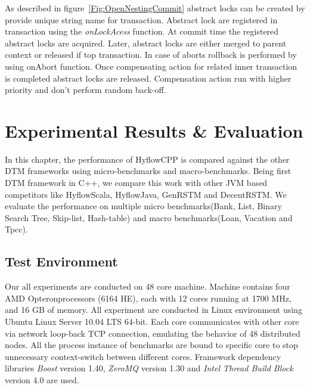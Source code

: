 \documentclass[12pt,english]{report}
\begin{document}
As described in figure~\ref{Fig:OpenNestingCommit} abstract locks can be created by provide unique string name for transaction. Abstract lock are registered in transaction using the \textit{onLockAcess} function. At commit time the registered abstract locks are acquired. Later, abstract locks are either merged to parent context or released if top transaction. In case of aborts rollback is performed by using onAbort function. Once compensating action for related inner transaction is completed abstract locks are released. Compensation action run with higher priority and don't perform random back-off.   


\chapter{Experimental Results \& Evaluation}\label{chap:expResults}

In this chapter, the performance of HyflowCPP is compared against the other DTM frameworks using micro-benchmarks and macro-benchmarks. Being first DTM framework in C++, we compare this work with other JVM based competitors like HyflowScala, HyflowJava, GenRSTM and DecentRSTM. We evaluate the performance on multiple micro benchmarks(Bank, List, Binary Search Tree, Skip-list, Hash-table) and  macro benchmarks(Loan, Vacation and Tpcc).   

\section{Test Environment}

Our all experiments are conducted on 48 core machine. Machine contains four AMD Opteron\texttrademark  processors (6164 HE), each with 12 cores running at 1700 MHz, and 16 GB of memory. All experiment are conducted in Linux environment using Ubuntu Linux Server 10.04 LTS 64-bit.  Each core communicates with other core via network loop-back TCP connection, emulating the behavior of 48 distributed nodes. All the process instance of benchmarks are bound to specific core to stop unnecessary context-switch between different cores. Framework dependency libraries \textit{Boost} version 1.40, \textit{ZeroMQ} version 1.30 and \textit{Intel Thread Build Block} version 4.0 are used.  
\end{document}
